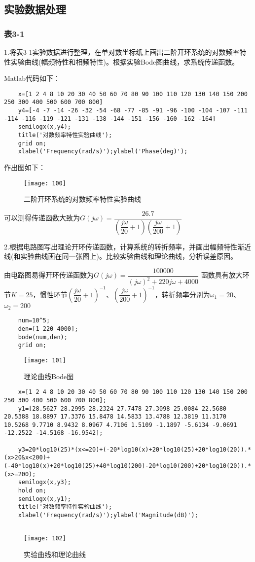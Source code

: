 \documentclass[UTF8,a4paper,10pt]{ctexart}
\begin{document}
	\subsection{实验数据处理}
	\subsubsection{表3-1}
	1.将表3-1实验数据进行整理，在单对数坐标纸上画出二阶开环系统的对数频率特性实验曲线(幅频特性和相频特性)。根据实验Bode图曲线，求系统传递函数。
	
	Matlab代码如下：
    \begin{lstlisting}
    x=[1 2 4 8 10 20 30 40 50 60 70 80 90 100 110 120 130 140 150 200 250 300 400 500 600 700 800] 
    y4=[-4 -7 -14 -26 -32 -54 -68 -77 -85 -91 -96 -100 -104 -107 -111 -114 -116 -119 -121 -131 -138 -144 -151 -156 -160 -162 -164]
    semilogx(x,y4);
    title('对数频率特性实验曲线');
    grid on;
    xlabel('Frequency(rad/s)');ylabel('Phase(deg)');
    \end{lstlisting}
    作出图如下：
    \begin{figure}[h]
    	\centering
    	\texttt{[image: 100]}
    	\caption{二阶开环系统的对数频率特性实验曲线}
    \end{figure}
	可以测得传递函数大致为$G(j\omega)=\dfrac{26.7}{(\dfrac{j\omega}{20}+1)(\dfrac{j\omega}{200}+1)}$
	
	2.根据电路图写出理论开环传递函数，计算系统的转折频率，并画出幅频特性渐近线(和实验曲线画在同一张图上)。比较实验曲线和理论曲线，分析误差原因。
	
	由电路图易得开环传递函数为$G(j\omega)=\dfrac{100000}{(j\omega)^2+220j\omega+4000}$
	函数具有放大环节$K=25$，惯性环节$(\dfrac{j\omega}{20}+1)^{-1}$、$(\dfrac{j\omega}{200}+1)^{-1}$，转折频率分别为$\omega_{1}=20$、$\omega_{2}=200$
	\begin{lstlisting}
	num=10^5;
	den=[1 220 4000];
	bode(num,den);
	grid on;
	\end{lstlisting}
	\begin{figure}[h]
		\centering
		\texttt{[image: 101]}
		\caption{理论曲线Bode图}
	\end{figure}
	\begin{lstlisting}
	x=[1 2 4 8 10 20 30 40 50 60 70 80 90 100 110 120 130 140 150 200 250 300 400 500 600 700 800];
	y1=[28.5627 28.2995 28.2324 27.7478 27.3098 25.0084 22.5680 20.5388 18.8897 17.3376 15.8478 14.5833 13.4788 12.3819 11.3170 10.5268 9.7710 8.9432 8.0967 4.7106 1.5109 -1.1897 -5.6134 -9.0691 -12.2522 -14.5168 -16.9542];
	
    y3=20*log10(25)*(x<=20)+(-20*log10(x)+20*log10(25)+20*log10(20)).*(x>20&x<200)+(-40*log10(x)+20*log10(25)+40*log10(200)-20*log10(200)+20*log10(20)).*(x>=200);
	semilogx(x,y3);
	hold on;
	semilogx(x,y1);
	title('对数频率特性实验曲线');
	xlabel('Frequency(rad/s)');ylabel('Magnitude(dB)');
	
	\end{lstlisting}
    \begin{figure}[h]
    	\centering
    	\texttt{[image: 102]}
    	\caption{实验曲线和理论曲线}
    \end{figure}
\end{document}
